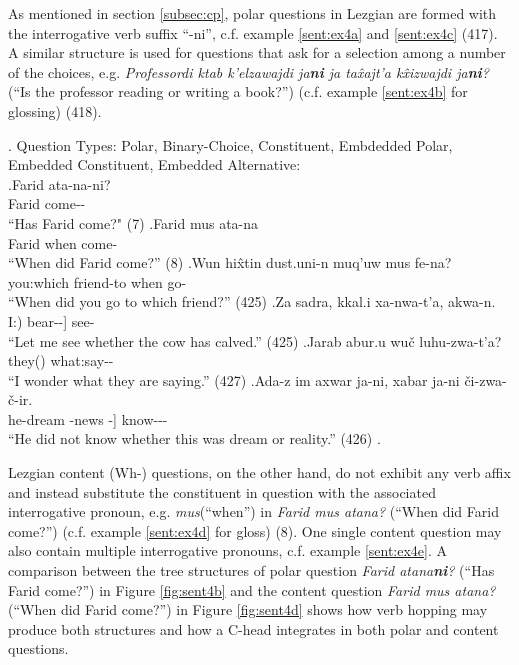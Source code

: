 As mentioned in section \ref{subsec:cp}, polar questions in Lezgian are formed with the interrogative verb suffix ``-ni'', c.f. example \ref{sent:ex4a} and \ref{sent:ex4c} (417). A similar structure is used for questions that ask for a selection among a number of the choices, e.g. \textit{Professordi ktab k'elzawajdi ja\textbf{ni} ja ta\^{x}ajt'a k\^{x}izwajdi ja\textbf{ni}?} (``Is the professor reading or writing a book?'') (c.f. example \ref{sent:ex4b} for glossing) (418).

\ex. Question Types: Polar, Binary-Choice, Constituent, Embdedded Polar, Embedded Constituent, Embedded Alternative:  \\
    \ag.\label{sent:ex4c}Farid ata-na-ni? \\ 
    Farid come-\Aori-\Q \\
    ``Has Farid come?" (7)
    \bg.\label{sent:ex4d}Farid mus ata-na \\
    Farid when come-\Aori \\
    ``When did Farid come?'' (8)
    \bg.\label{sent:ex4e}Wun hi\^{x}tin dust.uni-n muq'uw mus fe-na? \\
    you:\Abs[] which friend-\Gen[] to when go-\Aori[] \\
    ``When did you go to which friend?'' (425)
    \bg.\label{sent:ex4f}Za sadra, kkal.i xa-nwa-t'a, akwa-n. \\
    I:\Erg[] \Pt[] [cow(\Erg[]) bear-\Prf[]-\Cond[]] see-\Hort[] \\
    ``Let me see whether the cow has calved.'' (425)
    \bg.\label{sent:ex4g}Jarab abur.u wu\v{c} luhu-zwa-t'a? \\
    \Pt[] they(\Erg[]) what:\Abs[] say-\Impf[]-\Cond[] \\
    ``I wonder what they are saying.'' (427)
    \bg.\label{sent:ex4h}Ada-z im axwar ja-ni, xabar ja-ni \v{c}i-zwa-\v{c}-ir. \\
    he-\Dat[] [this:\Abs[] dream \Cop[]-\Q[] news \Cop[]-\Q[]] know-\Impf[]-\Neg[]-\Pst[] \\
    ``He did not know whether this was dream or reality.'' (426)
    \z.

Lezgian content (Wh-) questions, on the other hand, do not exhibit any verb affix and instead substitute the constituent in question with the associated interrogative pronoun, e.g. \textit{mus}(``when'') in \textit{Farid mus atana?} (``When did Farid come?'') (c.f. example \ref{sent:ex4d} for gloss) (8). One single content question may also contain multiple interrogative pronouns, c.f. example \ref{sent:ex4e}. A comparison between the tree structures of polar question \textit{Farid atana\textbf{ni}?} (``Has Farid come?'') in Figure \ref{fig:sent4b} and the content question \textit{Farid mus atana?} (``When did Farid come?'') in Figure \ref{fig:sent4d} shows how verb hopping may produce both structures and how a C-head integrates in both polar and content questions. 


